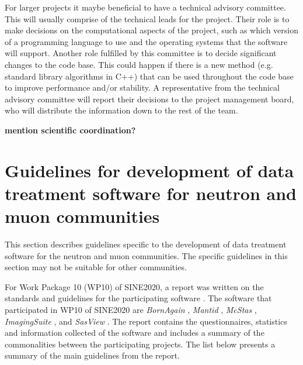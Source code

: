 \documentclass[jnr]{iosart2x}
\newcommand{\todo}[1]{\textbf{#1}}
\begin{document}
For larger projects it maybe beneficial to have a technical advisory committee.
This will usually comprise of the technical leads for the project.
Their role is to make decisions on the computational aspects of the project, such as which version of a programming language to use and the operating systems that the software will support.
Another role fulfilled by this committee is to decide significant changes to the code base.
This could happen if there is a new method (e.g. standard library algorithms in C++) that can be used throughout the code base to improve performance and/or stability.
A representative from the technical advisory committee will report their decisions to the project management board, who will distribute the information down to the rest of the team.

\todo{mention scientific coordination?}

\section{Guidelines for development of data treatment software for neutron and muon communities}
\label{SINE2020}

This section describes guidelines specific to the development of data treatment software for the neutron and muon communities.
The specific guidelines in this section may not be suitable for other communities.

For Work Package 10 (WP10) of SINE2020, a report was written on the standards and guidelines for the participating software \cite{sine2020_wp10_d10_report}.
The software that participated in WP10 of SINE2020 are {\it BornAgain} \cite{bornagain}, {\it Mantid} \cite{mantid}, {\it McStas} \cite{mcstas}, {\it ImagingSuite} \cite{ImagingSuite}, and {\it SasView} \cite{sasview}.
The report contains the questionnaires, statistics and information collected of the software and includes a summary of the commonalities between the participating projects.
The list below presents a summary of the main guidelines from the report.
\end{document}
